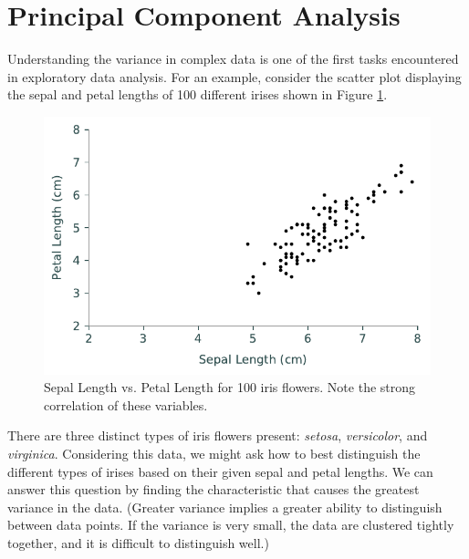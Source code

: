 \label{lab:pca}

\section*{Principal Component Analysis}
Understanding the variance in complex data is one of the first tasks encountered in exploratory data analysis. For an example, consider the scatter plot  displaying the sepal and petal lengths of 100 different irises shown in Figure \ref{fig:iris_1}.
\begin{figure}[H]
\includegraphics[width=.7\textwidth]{figures/iris0.pdf}
\caption{Sepal Length vs. Petal Length for 100 iris flowers. Note the strong correlation of these variables.}
\label{fig:iris_1}
\end{figure}
There are three distinct types of iris flowers present: \emph{setosa}, \emph{versicolor}, and \emph{virginica}.
Considering this data, we might ask how to best distinguish the different types of irises based on their given sepal and petal lengths.
We can answer this question by finding the characteristic that causes the greatest variance in the data.
(Greater variance implies a greater ability to distinguish between data points. If the variance is very small, the data are clustered tightly together, and it is difficult to distinguish well.)

